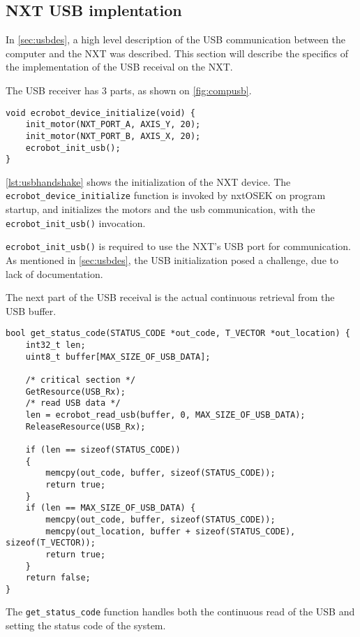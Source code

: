 \subsection{NXT USB implentation}
\label{sec:nxtusbimp}
In \autoref{sec:usbdes}, a high level description of the USB communication between the computer and the NXT was described.
This section will describe the specifics of the implementation of the USB receival on the NXT.

The USB receiver has 3 parts, as shown on \autoref{fig:compusb}.

\begin{lstlisting}[language=CSharp,label={lst:usbhandshake},caption={ecrobot\_device\_initialize method from nxt.c}]
void ecrobot_device_initialize(void) {
    init_motor(NXT_PORT_A, AXIS_Y, 20);
    init_motor(NXT_PORT_B, AXIS_X, 20);
    ecrobot_init_usb();
}
\end{lstlisting}


\autoref{lst:usbhandshake} shows the initialization of the NXT device.
The \texttt{ecrobot\_device\_initialize} function is invoked by nxtOSEK on program startup, and initializes the motors and the usb communication, with the \texttt{ecrobot\_init\_usb()} invocation.

\texttt{ecrobot\_init\_usb()} is required to use the NXT's USB port for communication.
As mentioned in \autoref{sec:usbdes}, the USB initialization posed a challenge, due to lack of documentation.

The next part of the USB receival is the actual continuous retrieval from the USB buffer.
\begin{lstlisting}[language=CSharp,label={lst:usbreceive},caption={get\_status\_code method from usb.c}]
bool get_status_code(STATUS_CODE *out_code, T_VECTOR *out_location) {
	int32_t len;
	uint8_t buffer[MAX_SIZE_OF_USB_DATA];

	/* critical section */
	GetResource(USB_Rx);
	/* read USB data */
	len = ecrobot_read_usb(buffer, 0, MAX_SIZE_OF_USB_DATA);
	ReleaseResource(USB_Rx);

	if (len == sizeof(STATUS_CODE))
	{
		memcpy(out_code, buffer, sizeof(STATUS_CODE));
		return true;
	}
	if (len == MAX_SIZE_OF_USB_DATA) {
		memcpy(out_code, buffer, sizeof(STATUS_CODE));
		memcpy(out_location, buffer + sizeof(STATUS_CODE), sizeof(T_VECTOR));
		return true;
	}
	return false;
}
\end{lstlisting}
The \texttt{get\_status\_code} function handles both the continuous read of the USB and setting the status code of the system.

